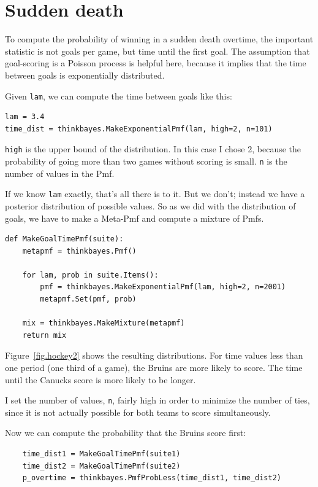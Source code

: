 \documentclass[12pt]{book}
\begin{document}
\section{Sudden death}

To compute the probability of winning in a sudden death overtime,
the important statistic is not goals per game, but time until the
first goal.  The assumption that goal-scoring is a Poisson process
is helpful here, because it implies that the time between goals
is exponentially distributed.

Given {\tt lam}, we can compute the time between goals like this: 

\begin{verbatim}
lam = 3.4
time_dist = thinkbayes.MakeExponentialPmf(lam, high=2, n=101)
\end{verbatim}  

{\tt high} is the upper bound of the distribution.  In this case
I chose 2, because the probability of going more than two games
without scoring is small.  {\tt n} is the number of values in
the Pmf.

If we know {\tt lam} exactly, that's all there is to it.
But we don't; instead we have a posterior
distribution of possible values.  So as we did with the distribution
of goals, we have to make a Meta-Pmf and compute a mixture of
Pmfs.

\begin{verbatim}
def MakeGoalTimePmf(suite):
    metapmf = thinkbayes.Pmf()

    for lam, prob in suite.Items():
        pmf = thinkbayes.MakeExponentialPmf(lam, high=2, n=2001)
        metapmf.Set(pmf, prob)

    mix = thinkbayes.MakeMixture(metapmf)
    return mix
\end{verbatim}  

Figure~\ref{fig.hockey2} shows the resulting distributions.  For
time values less than one period (one third of a game), the Bruins
are more likely to score.  The time until the Canucks score is
more likely to be longer.

I set the number of values, {\tt n},
fairly high in order to minimize the number of ties, since it is not
actually possible for both teams to score simultaneously.

Now we can compute the probability that the Bruins score first:

\begin{verbatim}
    time_dist1 = MakeGoalTimePmf(suite1)
    time_dist2 = MakeGoalTimePmf(suite2)
    p_overtime = thinkbayes.PmfProbLess(time_dist1, time_dist2)
\end{verbatim}  
\end{document}

